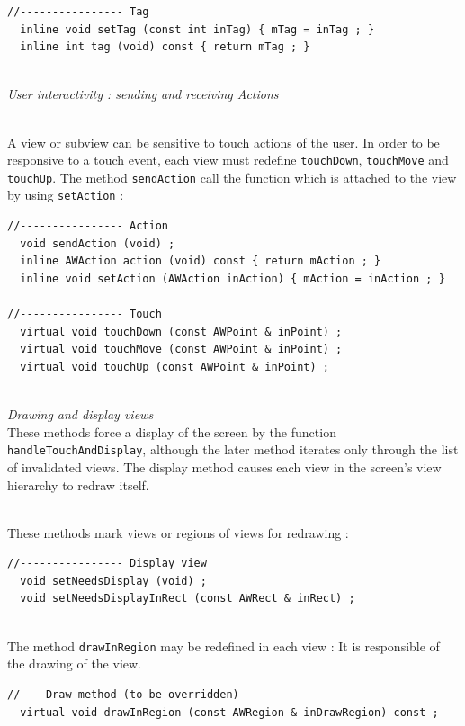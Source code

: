 \documentclass[a4paper,11pt]{extarticle}
\begin{document}
\begin{lstlisting}[language=Arduinonl]
//---------------- Tag
  inline void setTag (const int inTag) { mTag = inTag ; }
  inline int tag (void) const { return mTag ; }
\end{lstlisting}

~\\ \emph{User interactivity : sending and receiving Actions}

~\\A view or subview can be sensitive to touch actions of the user. In order to be responsive to a touch event, each view must redefine \texttt{touchDown}, \texttt{touchMove} and \texttt{touchUp}. The method \texttt{sendAction} call the function which is attached to the view by using \texttt{setAction} :

\begin{lstlisting}[language=Arduinonl]
//---------------- Action
  void sendAction (void) ;
  inline AWAction action (void) const { return mAction ; }
  inline void setAction (AWAction inAction) { mAction = inAction ; }

//---------------- Touch
  virtual void touchDown (const AWPoint & inPoint) ;
  virtual void touchMove (const AWPoint & inPoint) ;
  virtual void touchUp (const AWPoint & inPoint) ;
\end{lstlisting}

~\\ \emph{Drawing and display views}
~\\ These methods force a display of the screen by the function \texttt{handleTouchAndDisplay}, although the later method iterates only through the list of invalidated views. The display method causes each view in the screen's view hierarchy to redraw itself. 

~\\ These methods mark views or regions of views for redrawing 
:
\begin{lstlisting}[language=Arduinonl]
//---------------- Display view
  void setNeedsDisplay (void) ;
  void setNeedsDisplayInRect (const AWRect & inRect) ;
\end{lstlisting}

~\\ The method \texttt{drawInRegion} may be redefined in each view : It is responsible of the drawing of the view.

\begin{lstlisting}[language=Arduinonl]
//--- Draw method (to be overridden)
  virtual void drawInRegion (const AWRegion & inDrawRegion) const ;
\end{lstlisting}
\end{document}
